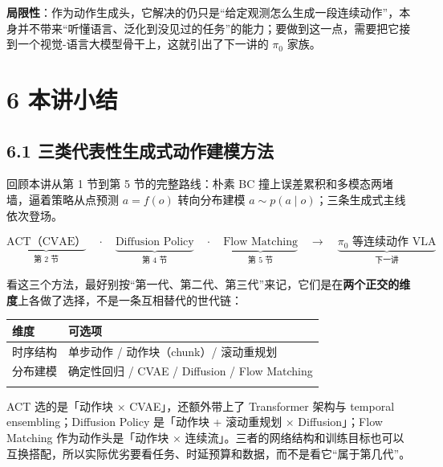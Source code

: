 \documentclass[
  chinese,
]{ctexart}
\begin{document}
\textbf{局限性}：作为动作生成头，它解决的仍只是``给定观测怎么生成一段连续动作''，本身并不带来``听懂语言、泛化到没见过的任务''的能力；要做到这一点，需要把它接到一个视觉-语言大模型骨干上，这就引出了下一讲的
\(\pi_0\) 家族。

\section{6 本讲小结}\label{ux672cux8bb2ux5c0fux7ed3}

\subsection{6.1
三类代表性生成式动作建模方法}\label{ux4e09ux7c7bux4ee3ux8868ux6027ux751fux6210ux5f0fux52a8ux4f5cux5efaux6a21ux65b9ux6cd5}

回顾本讲从第 1 节到第 5 节的完整路线：朴素 BC
撞上误差累积和多模态两堵墙，逼着策略从点预测 \(a = f(o)\) 转向分布建模
\(a \sim p(a \mid o)\)；三条生成式主线依次登场。

\[
\underbrace{\text{ACT（CVAE）}}_{\text{第 2 节}} \quad\cdot\quad \underbrace{\text{Diffusion Policy}}_{\text{第 4 节}} \quad\cdot\quad \underbrace{\text{Flow Matching}}_{\text{第 5 节}} \quad\longrightarrow\quad \underbrace{\text{$\pi_0$ 等连续动作 VLA}}_{\text{下一讲}}
\]

看这三个方法，最好别按``第一代、第二代、第三代''来记，它们是在\textbf{两个正交的维度}上各做了选择，不是一条互相替代的世代链：

\begin{center}
\begin{tabular}{@{}>{\raggedright\arraybackslash}p{} >{\raggedright\arraybackslash}p{}@{}}
\toprule\noalign{}
维度 & 可选项 \\
\midrule\noalign{}
时序结构 & 单步动作 / 动作块（chunk）/ 滚动重规划 \\
分布建模 & 确定性回归 / CVAE / Diffusion / Flow Matching \\
\bottomrule\noalign{}
\end{tabular}
\end{center}

ACT 选的是「动作块 × CVAE」，还额外带上了 Transformer 架构与 temporal
ensembling；Diffusion Policy 是「动作块 + 滚动重规划 × Diffusion」；Flow
Matching 作为动作头是「动作块 ×
连续流」。三者的网络结构和训练目标也可以互换搭配，所以实际优劣要看任务、时延预算和数据，而不是看它``属于第几代''。
\end{document}
